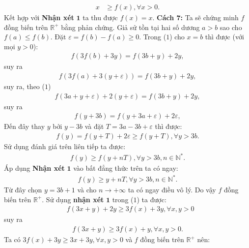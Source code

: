 \begin{multicols}{2}
\begin{align*}
		x &\ge f(x),\forall x > 0.
	\end{align*}
	Kết hợp với \textbf{\color{hoccungpi}Nhận xét} $\pmb1$ ta thu được $f(x) = x$.
	\vskip 0.1cm
	\textbf{\color{hoccungpi}Cách $\pmb7$:}
	\vskip 0.1cm  
	Ta sẽ chứng minh $f$  đồng biến trên $\mathbb{R^+}$  bằng phản chứng. 
	\vskip 0.1cm
	Giả sử tồn tại hai số dương $a> b$  sao cho $f(a) \le f(b).$  Đặt  $\varepsilon  = f(b) - f(a) \ge 0.$
	\vskip 0.1cm
	Trong ($1$) cho  $x = b$ thì được (với mọi $y>0$): 
	\begin{align*}
		f(3f(b) + 3y) = f(3b + y) + 2y,
	\end{align*}
	suy ra
	\begin{align*}
		f(3f(a) + 3(y + \varepsilon )) = f(3b + y) + 2y,
	\end{align*}
	suy ra, theo ($1$)
	\begin{align*}
		f(3a \!+\! y \!+\! \varepsilon ) \!+\! 2(y \!+\! \varepsilon ) \!=\! f(3b \!+\! y) \!+\! 2y,
	\end{align*}
	suy ra
	\begin{align*}
		f(y + 3b) = f(y + 3a + \varepsilon ) + 2\varepsilon,
	\end{align*}
	Đến đây thay $y$  bởi $y - 3b$  và đặt $T = 3a - 3b + \varepsilon$  thì được: 
	\begin{align*}
		f(y) = f(y \!+\! T) \!+\! 2\varepsilon  \ge f(y \!+\! T),\forall y \!>\! 3b.	
	\end{align*}
	Sử dụng đánh giá trên liên tiếp ta được: 
	\begin{align*}
		f(y) \ge f(y + nT),\forall y > 3b,n \in \mathbb{N^*}.
	\end{align*}
	Áp dụng \textbf{\color{hoccungpi}Nhận xét} $\pmb1$ vào bất đẳng thức trên ta có ngay:
	\begin{align*}
		f(y) \ge y + nT,\forall y > 3b,n \in \mathbb{N^*}.
	\end{align*}
	Từ đây chọn $y =3b + 1$ và cho $n \to + \infty$  ta có ngay điều vô lý. Do vậy $f$  đồng biến trên  $\mathbb{R^+}$.
	\vskip 0.1cm
	Sử dụng \textbf{\color{hoccungpi}nhận xét} $\pmb1$ trong ($1$) ta được: 
	\begin{align*}
		&f(3x + y) + 2y \ge 3f(x) + 3y,\forall x,y > 0
	\end{align*}
	suy ra
	\begin{align*}
		f(3x + y) \ge 3f(x) + y,\forall x,y > 0. \tag{$11$}
	\end{align*}
	Ta có $3f(x) + 3y \ge 3x + 3y,\forall x,y > 0$  và $f$  đồng biến trên $\mathbb{R^+}$  nên:
	\begin{align*}

\end{align*}
\end{multicols}
